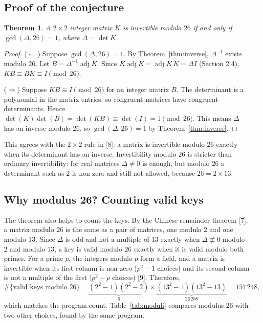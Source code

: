 \documentclass[11pt,a4paper]{article}
\newcommand{\adj}{\operatorname{adj}}
\theoremstyle{plain}
\newtheorem{theorem}{Theorem}
\theoremstyle{definition}
\begin{document}
\subsection{Proof of the conjecture}

\begin{theorem}\label{thm:keys}
A $2\times2$ integer matrix $K$ is invertible modulo $26$ if and only if $\gcd(\Delta,26)=1$, where $\Delta=\det K$.
\end{theorem}
\begin{proof}
($\Leftarrow$) Suppose $\gcd(\Delta,26)=1$. By Theorem~\ref{thm:inverse}, $\Delta^{-1}$ exists modulo $26$. Let $B=\Delta^{-1}\adj K$. Since $K\adj K=\adj K\,K=\Delta I$ (Section 2.4), $KB\equiv BK\equiv I\pmod{26}$.

($\Rightarrow$) Suppose $KB\equiv I\pmod{26}$ for an integer matrix $B$. The determinant is a polynomial in the matrix entries, so congruent matrices have congruent determinants. Hence $\det(K)\det(B)=\det(KB)\equiv\det(I)=1\pmod{26}$. This means $\Delta$ has an inverse modulo $26$, so $\gcd(\Delta,26)=1$ by Theorem~\ref{thm:inverse}.
\end{proof}

This agrees with the $2\times2$ rule in [8]: a matrix is invertible modulo $26$ exactly when its determinant has an inverse. Invertibility modulo $26$ is stricter than ordinary invertibility: for real matrices $\Delta\neq0$ is enough, but modulo $26$ a determinant such as $2$ is non-zero and still not allowed, because $26=2\times13$.

\subsection{Why modulus 26? Counting valid keys}

The theorem also helps to count the keys. By the Chinese remainder theorem [7], a matrix modulo $26$ is the same as a pair of matrices, one modulo $2$ and one modulo $13$. Since $\Delta$ is odd and not a multiple of $13$ exactly when $\Delta\not\equiv0$ modulo $2$ and modulo $13$, a key is valid modulo $26$ exactly when it is valid modulo both primes. For a prime $p$, the integers modulo $p$ form a field, and a matrix is invertible when its first column is non-zero ($p^2-1$ choices) and its second column is not a multiple of the first ($p^2-p$ choices) [9]. Therefore,
\[
\#\{\text{valid keys modulo }26\}=\underbrace{(2^2-1)(2^2-2)}_{6}\times\underbrace{(13^2-1)(13^2-13)}_{26\,208}=157\,248,
\]
which matches the program count. Table~\ref{tab:moduli} compares modulus $26$ with two other choices, found by the same program.
\end{document}
